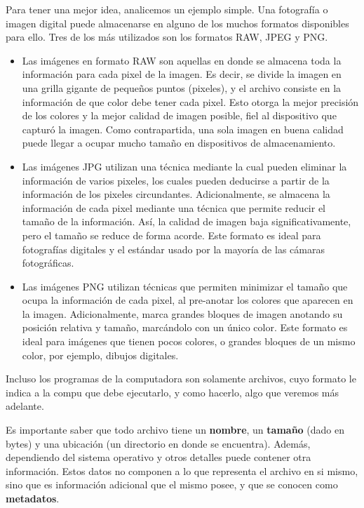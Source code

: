 Para tener una mejor idea, analicemos un ejemplo simple. Una fotografía o imagen
digital puede almacenarse en alguno de los muchos formatos disponibles para ello.
Tres de los más utilizados son los formatos RAW, JPEG y PNG.
\begin{itemize}
    \item Las imágenes en formato RAW son aquellas en donde se almacena toda la
        información para cada pixel de la imagen. Es decir, se divide la imagen
        en una grilla gigante de pequeños puntos (pixeles), y el archivo consiste
        en la información de que color debe tener cada pixel. Esto otorga la
        mejor precisión de los colores y la mejor calidad de imagen posible, fiel
        al dispositivo que capturó la imagen. Como contrapartida, una sola imagen
        en buena calidad puede llegar a ocupar mucho tamaño en dispositivos de
        almacenamiento.
    \item Las imágenes JPG utilizan una técnica mediante la cual pueden eliminar
        la información de varios pixeles, los cuales pueden deducirse a partir de
        la información de los pixeles circundantes. Adicionalmente, se almacena
        la información de cada pixel mediante una técnica que permite reducir
        el tamaño de la información. Así, la calidad de imagen baja
        significativamente, pero el tamaño se reduce de forma acorde. Este formato
        es ideal para fotografías digitales y el estándar usado por la mayoría
        de las cámaras fotográficas.
    \item Las imágenes PNG utilizan técnicas que permiten minimizar el tamaño que
        ocupa la información de cada pixel, al pre-anotar los colores que aparecen
        en la imagen. Adicionalmente, marca grandes bloques de imagen anotando su
        posición relativa y tamaño, marcándolo con un único color. Este formato es
        ideal para imágenes que tienen pocos colores, o grandes bloques de un
        mismo color, por ejemplo, dibujos digitales.
\end{itemize}

Incluso los programas de la computadora son solamente archivos, cuyo formato
le indica a la compu que debe ejecutarlo, y como hacerlo, algo que veremos más
adelante.

Es importante saber que todo archivo tiene un \textbf{nombre}, un \textbf{tamaño}
(dado en bytes) y una ubicación (un directorio en donde se encuentra). Además,
dependiendo del sistema operativo y otros detalles puede contener otra información.
Estos datos no componen a lo que representa el archivo en si mismo, sino que es
información adicional que el mismo posee, y que se conocen como \textbf{metadatos}.

